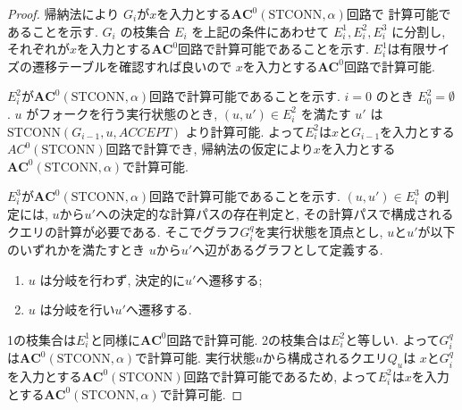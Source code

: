 \documentclass[10pt,a4paper,twocolumn]{jarticle}
\theoremstyle{definition}
\theoremstyle{remark}
\newcommand{\classfont}{\mathbf}
\newcommand{\AC}{\classfont{AC}}
\newcommand{\probfont}{\text}
\newcommand{\STCONN}{\probfont{STCONN}}
\begin{document}
\begin{proof}
 帰納法により $G_i$が$x$を入力とする$\AC^0(\STCONN, \alpha)$回路で
 計算可能であることを示す.
 $G_i$ の枝集合 $E_i$ を上記の条件にあわせて $E^1_i, E^2_i, E^3_i$ に分割し,
 それぞれが$x$を入力とする$\AC^0$回路で計算可能であることを示す.
 $E^1_i$は有限サイズの遷移テーブルを確認すれば良いので
 $x$を入力とする$\AC^0$回路で計算可能.

 $E^2_i$が$\AC^0(\STCONN, \alpha)$回路で計算可能であることを示す.
 $i=0$ のとき $E^2_0 = \emptyset$.
 $u$ がフォークを行う実行状態のとき,
 $(u, u') \in E^2_i$ を満たす $u'$ は
 $\STCONN(G_{i-1}, u, ACCEPT)$ より計算可能.
 よって$E^2_i$は$x$と$G_{i-1}$を入力とする$AC^0(\STCONN)$回路で計算でき,
 帰納法の仮定により$x$を入力とする$\AC^0(\STCONN, \alpha)$で計算可能.


 $E^3_i$が$\AC^0(\STCONN, \alpha)$回路で計算可能であることを示す.
 $(u, u') \in E^3_i$ の判定には, $u$から$u'$への決定的な計算パスの存在判定と,
 その計算パスで構成されるクエリの計算が必要である.
 そこでグラフ$G^q_i$を実行状態を頂点とし, $u$と$u'$が以下のいずれかを満たすとき
 $u$から$u'$へ辺があるグラフとして定義する.
 \begin{enumerate}
 \item $u$ は分岐を行わず, 決定的に$u'$へ遷移する;
 \item $u$ は分岐を行い$u'$へ遷移する.
 \end{enumerate}
 1の枝集合は$E^1_i$と同様に$\AC^0$回路で計算可能.
 2の枝集合は$E^2_i$と等しい.
 よって$G^q_i$は$\AC^0(\STCONN, \alpha)$で計算可能.
 実行状態$u$から構成されるクエリ$Q_u$は
 $x$と$G^q_i$を入力とする$\AC^0(\STCONN)$回路で計算可能であるため,
 よって$E^2_i$は$x$を入力とする$\AC^0(\STCONN, \alpha)$で計算可能.
\end{proof}



\end{document}
